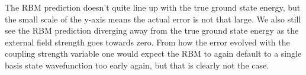 The RBM prediction doesn't quite line up with the true ground state energy, but the small scale of the y-axis means the actual error is not that large. We also still see the RBM prediction diverging away from the true ground state energy as the external field strength goes towards zero. From how the error evolved with the coupling strength variable one would expect the RBM to again default to a single basis state wavefunction too early again, but that is clearly not the case. 

